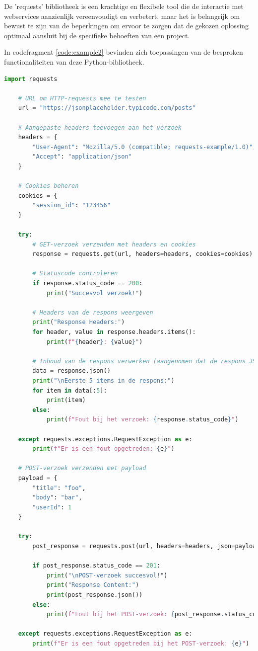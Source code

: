 De 'requests' bibliotheek is een krachtige en flexibele tool die de interactie met webservices aanzienlijk vereenvoudigt en verbetert, maar het is belangrijk om bewust te zijn van de beperkingen om ervoor te zorgen dat de gekozen oplossing optimaal aansluit bij de specifieke behoeften van een project.

In codefragment \ref{code:example2} bevinden zich toepassingen van de besproken functionaliteiten van deze Python-bibliotheek.

\begin{lstlisting}[language=python, captionpos=b, caption={Een voorbeeld van de kernfunctionaliteiten van requests.}, label={code:example2}]
    import requests

    # URL om HTTP-requests mee te testen
    url = "https://jsonplaceholder.typicode.com/posts"

    # Aangepaste headers toevoegen aan het verzoek
    headers = {
        "User-Agent": "Mozilla/5.0 (compatible; requests-example/1.0)",
        "Accept": "application/json"
    }

    # Cookies beheren
    cookies = {
        "session_id": "123456"
    }

    try:
        # GET-verzoek verzenden met headers en cookies
        response = requests.get(url, headers=headers, cookies=cookies)

        # Statuscode controleren
        if response.status_code == 200:
            print("Succesvol verzoek!")

        # Headers van de respons weergeven
        print("Response Headers:")
        for header, value in response.headers.items():
            print(f"{header}: {value}")

        # Inhoud van de respons verwerken (aangenomen dat de respons JSON is)
        data = response.json()
        print("\nEerste 5 items in de respons:")
        for item in data[:5]:
            print(item)
        else:
            print(f"Fout bij het verzoek: {response.status_code}")

    except requests.exceptions.RequestException as e:
        print(f"Er is een fout opgetreden: {e}")

    # POST-verzoek verzenden met payload
    payload = {
        "title": "foo",
        "body": "bar",
        "userId": 1
    }

    try:
        post_response = requests.post(url, headers=headers, json=payload, cookies=cookies)

        if post_response.status_code == 201:
            print("\nPOST-verzoek succesvol!")
            print("Response Content:")
            print(post_response.json())
        else:
            print(f"Fout bij het POST-verzoek: {post_response.status_code}")

    except requests.exceptions.RequestException as e:
        print(f"Er is een fout opgetreden bij het POST-verzoek: {e}")

\end{lstlisting}


